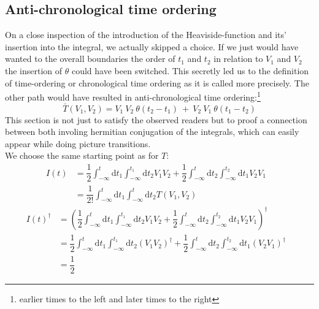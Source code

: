 \documentclass[12pt, titlepage]{article}
\begin{document}
\begin{subappendices}
\subsection{Anti-chronological time ordering}
On a close inspection of the introduction of the Heaviside-function and its' insertion into the integral, we actually skipped a choice. If we just would have wanted to the overall boundaries the order of $ t_1 $ and $ t_2 $ in relation to $ V_1 $ and $ V_2 $ the insertion of $  \theta$  could have been switched. This secretly led us to the definition of time-ordering or chronological time ordering as it is called more precisely. The other path would have resulted in anti-chronological time ordering:\footnote{
earlier times to the left and later times to the right
}
\begin{equation}\label{anti_o}
 \bar{T}(V_1,V_2)
 =
 V_1\ V_2\ \theta (t_2 -t_1)\ +\ V_2\  V_1 \ \theta (t_1-t_2)
\end{equation} 
This section is not just to satisfy the observed readers but to proof a connection between both involing hermitian conjugation of the integrals, which can easily appear while doing picture transitions.
\\
We choose the same starting point as for $ T $:
\begin{align*}
  I(t)
  &= \dfrac{1}{2}
	 \int_{-\infty}^{t}\mathrm{d}t_1\int_{-\infty}^{t_1}\! \! \mathrm{d}t_2
	 V_1 V_2
	+
	\dfrac{1}{2}
	\int_{-\infty}^{t}\mathrm{d}t_2\int_{-\infty}^{t_2}\! \! \mathrm{d}t_1
	V_2 V_1
	 &\\
  &= \dfrac{1}{2!}
	 \int_{-\infty}^{t}\mathrm{d}t_1\int_{-\infty}^{t}\! \! \mathrm{d}t_2
	 T(V_1,V_2)
\end{align*}
\begin{subequations}
\begin{align}
  I(t)^{\dagger}
  &=\left(  \dfrac{1}{2}
	 \int_{-\infty}^{t}\mathrm{d}t_1\int_{-\infty}^{t_1}\! \! \mathrm{d}t_2
	 V_1 V_2
	+
	\dfrac{1}{2}
	\int_{-\infty}^{t}\mathrm{d}t_2\int_{-\infty}^{t_2}\! \! \mathrm{d}t_1
	V_2 V_1
	\right) ^{\dagger}
	 &\\
  &=  \dfrac{1}{2}
	 \int_{-\infty}^{t}\mathrm{d}t_1\int_{-\infty}^{t_1}\! \! \mathrm{d}t_2
	 \left(V_1 V_2\right) ^{\dagger}
	+
	\dfrac{1}{2}
	\int_{-\infty}^{t}\mathrm{d}t_2\int_{-\infty}^{t_2}\! \! \mathrm{d}t_1
	\left( V_2 V_1\right) ^{\dagger}
	&\\	
  &=  \dfrac{1}{2}

\end{align}
\end{subequations}
\end{subappendices}
\end{document}
